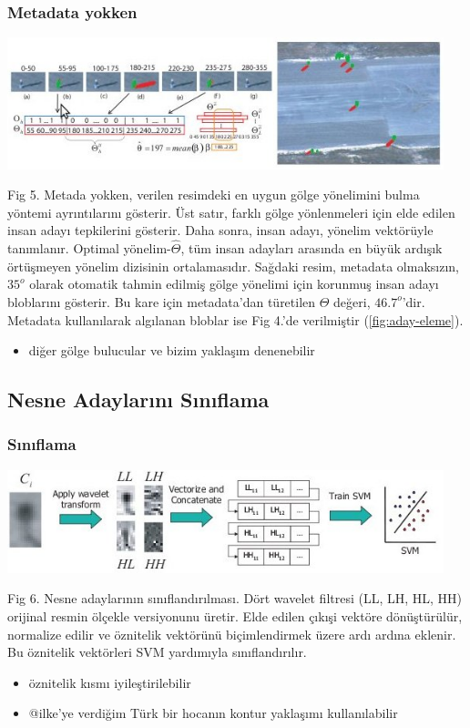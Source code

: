 \documentclass{beamer}
\begin{document}
\begin{frame}
	\frametitle{Metadata yokken}

	\includegraphics[width=0.95\textwidth]{img/fig5.jpg}\label{fig:optimal-shadow-orientation}

	\begin{scriptsize}
		Fig 5. Metada yokken, verilen resimdeki en uygun gölge yönelimini bulma
		yöntemi ayrıntılarını gösterir. Üst satır, farklı gölge yönlenmeleri için
		elde edilen insan adayı tepkilerini gösterir. Daha sonra, insan adayı,
		yönelim vektörüyle tanımlanır. Optimal yönelim-$\hat{\Theta}$, tüm insan
		adayları arasında en büyük ardışık örtüşmeyen yönelim dizisinin
		ortalamasıdır. Sağdaki resim, metadata olmaksızın, $35^o$ olarak otomatik
		tahmin edilmiş gölge yönelimi için korunmuş insan adayı bloblarını gösterir.
		Bu kare için metadata'dan türetilen $\Theta$ değeri, $46.7^o$'dir. Metadata
		kullanılarak algılanan bloblar ise Fig 4.'de verilmiştir
		(\ref{fig:aday-eleme}).
	\end{scriptsize}

	\begin{itemize}
		\item diğer gölge bulucular ve bizim yaklaşım denenebilir
	\end{itemize}
\end{frame}

\subsection{Nesne Adaylarını Sınıflama}

\begin{frame}
	\frametitle{Sınıflama}

	\includegraphics[width=0.95\textwidth]{img/fig6.jpg}\label{fig:classification}

	Fig 6. Nesne adaylarının sınıflandırılması. Dört wavelet filtresi (LL, LH,
	HL, HH) orijinal resmin ölçekle versiyonunu üretir. Elde edilen çıkışi
	vektöre dönüştürülür, normalize edilir ve öznitelik vektörünü biçimlendirmek
	üzere ardı ardına eklenir. Bu öznitelik vektörleri SVM yardımıyla
	sınıflandırılır.

	\begin{itemize}
		\item öznitelik kısmı iyileştirilebilir
		\item @ilke'ye verdiğim Türk bir hocanın kontur yaklaşımı kullanılabilir
	\end{itemize}
\end{frame}
\end{document}
